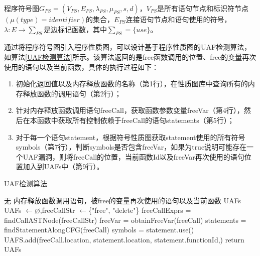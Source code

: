 {\begin{definition}
 \label{符号图定义}
 程序符号图$G_{PS}=(V_{PS},E_{PS},\lambda_{PS} ,\mu_{PS}, s,d)$，$V_{PS}$是所有语句节点和标识符节点$(\mu(type) = identifier)$的集合，$E_{PS}$连接语句节点和语句使用的符号，$\lambda : E \rightarrow \sum_{PS}$是边标记函数，其中$\sum_{PS} = \{use\}$。
\end{definition}

通过将程序符号图引入程序性质图，可以设计基于程序性质图的UAF检测算法，如算法\ref{UAF检测算法}所示。该算法返回的是free函数调用的位置、free的变量再次使用的语句以及当前函数，具体的执行过程如下：

\begin{enumerate}[(1)]
\item 初始化返回值以及内存释放函数的名称（第1行），在性质图库中查询所有的内存释放函数的调用语句（第2行）；
\item 针对内存释放函数调用语句freeCall，获取函数参数变量freeVar（第4行），然后在本函数中获取所有控制依赖于freeCall的语句statements（第5行）；
\item 对于每一个语句statement，根据符号性质图获取statement使用的所有符号symbols（第7行），判断symbols是否包含freeVar，如果为true说明可能存在一个UAF漏洞，则将freeCall的位置，当前函数Id以及freeVar再次使用的语句位置加入到UAFs中（第9行）。
\end{enumerate}

\begin{algorithm}
	\renewcommand{\algorithmicrequire}{\textbf{Input:}}
	\renewcommand{\algorithmicensure}{\textbf{Output:}}
	\caption{UAF检测算法}
	\label{UAF检测算法}
	\begin{algorithmic}[1]
		\REQUIRE 无
		\ENSURE 内存释放函数调用语句，被free的变量再次使用的语句以及当前函数 UAFs
		\STATE UAFs $\leftarrow \varnothing$,freeCallStr $\leftarrow$\{"free", "delete"\}
		\STATE freeCallExprs = findCallASTNode(freeCallStr)
			\STATE freeVar = obtainFreeVar(freeCall)
			\STATE statements = findStatementAlongCFG(freeCall)
				\STATE symbols = statement.use()
					\STATE UAFS.add(freeCall.location, statement.location, statement.functionId,)
				\ENDIF
			\ENDFOR
		\ENDFOR
	\STATE return UAFs	
	\end{algorithmic}
\end{algorithm}


}
